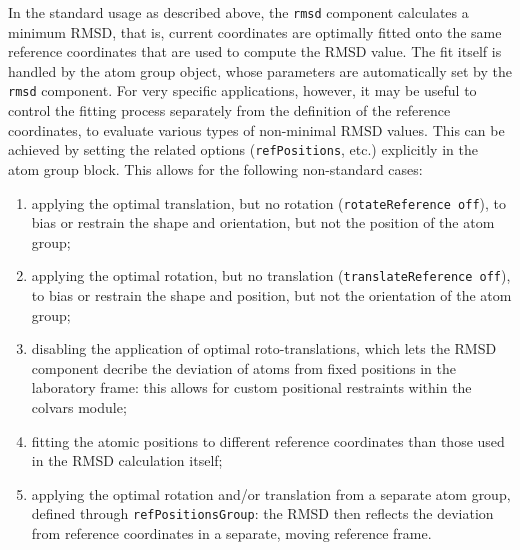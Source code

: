 In the standard usage as described above, the \texttt{rmsd} component
calculates a minimum RMSD, that is, current coordinates are optimally
fitted onto the same reference coordinates that are used to 
compute the RMSD value. The fit itself is handled by the atom group
object, whose parameters are automatically set by the \texttt{rmsd}
component.
For very specific applications, however, it may be
useful to control the fitting process separately from the definition
of the reference coordinates, to evaluate various types of
non-minimal RMSD values. This can be achieved by setting the
related options (\texttt{refPositions}, etc.) explicitly in the
atom group block. This allows for the following non-standard cases:

\begin{enumerate}
\item applying the optimal translation, but no rotation
(\texttt{rotateReference off}), to bias or restrain the shape and
orientation, but not the position of the atom group;
\item applying the optimal rotation, but no translation
(\texttt{translateReference off}), to bias or restrain the shape and
position, but not the orientation of the atom group;
\item disabling the application of optimal roto-translations, which
lets the RMSD component decribe the deviation of atoms
from fixed positions in the laboratory frame: this allows for custom
positional restraints within the colvars module;
\item fitting the atomic positions to different reference coordinates
than those used in the RMSD calculation itself;
\item applying the optimal rotation and/or translation from a separate
atom group, defined through \texttt{refPositionsGroup}: the RMSD then
reflects the deviation from reference coordinates in a separate, moving
reference frame.
\end{enumerate}


